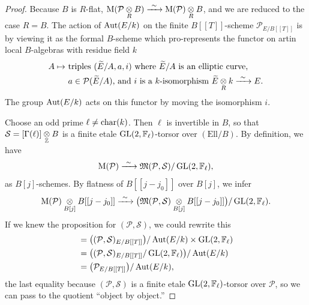 \begin{proof}
Because $B$ is $R$-flat, $\mathrm{M}(\mathcal{P} \underset{R}{\otimes} B) \xrightarrow{\ \sim\ } \mathrm{M}(\mathcal{P}) \underset{R}{\otimes} B$, and we are reduced to the case $R = B$. The action of $\operatorname{Aut}(E/k)$ on the finite $B[[T]]$-scheme $\mathcal{P}_{E/B[[T]]}$ is by viewing it as the formal $B$-scheme which pro-represents the functor on artin local $B$-algebras with residue field $k$
\[
\begin{aligned}
A \mapsto\ &\text{triples } (\widetilde{E}/A, a, i) \text{ where } \widetilde{E}/A \text{ is an elliptic curve,} \\
&\text{$a \in \mathcal{P}(\widetilde{E}/A)$, and $i$ is a $k$-isomorphism } \widetilde{E} \underset{R}{\otimes} k \xrightarrow{\ \sim\ } E .
\end{aligned}
\]
The group $\operatorname{Aut}(E/k)$ acts on this functor by moving the isomorphism $i$.

Choose an odd prime $\ell \ne \operatorname{char}(k)$. Then $\ell$ is invertible in $B$, so that $\mathcal{S} = [\Gamma(\ell)] \underset{\mathbb{Z}}{\otimes} B$ is a finite etale $\operatorname{GL}(2, \mathbb{F}_\ell)$-torsor over $(\mathrm{Ell}/B)$. By definition, we have
\[
\mathrm{M}(\mathcal{P}) \xrightarrow{\ \sim\ } \mathfrak{M}(\mathcal{P}, \mathcal{S})/\operatorname{GL}(2, \mathbb{F}_\ell) ,
\]
as $B[j]$-schemes. By flatness of $B[[j - j_0]]$ over $B[j]$, we infer
\[
\mathrm{M}(\mathcal{P}) \underset{B[j]}{\otimes} B[[j - j_0]] \xrightarrow{\ \sim\ } \bigl(\mathfrak{M}(\mathcal{P}, \mathcal{S}) \underset{B[j]}{\otimes} B[[j - j_0]]\bigr)/\operatorname{GL}(2, \mathbb{F}_\ell) .
\]
If we knew the proposition for $(\mathcal{P}, \mathcal{S})$, we could rewrite this
\[
\begin{aligned}
&= \bigl((\mathcal{P}, \mathcal{S})_{E/B[[T]]}\bigr)/\operatorname{Aut}(E/k) \times \operatorname{GL}(2, \mathbb{F}_\ell) \\
&= \bigl((\mathcal{P}, \mathcal{S})_{E/B[[T]]}/\operatorname{GL}(2, \mathbb{F}_\ell)\bigr)/\operatorname{Aut}(E/k) \\
&= \bigl(\mathcal{P}_{E/B[[T]]}\bigr)/\operatorname{Aut}(E/k) ,
\end{aligned}
\]
the last equality because $(\mathcal{P}, \mathcal{S})$ is a finite etale $\operatorname{GL}(2, \mathbb{F}_\ell)$-torsor over $\mathcal{P}$, so we can pass to the quotient ``object by object.''


\end{proof}

